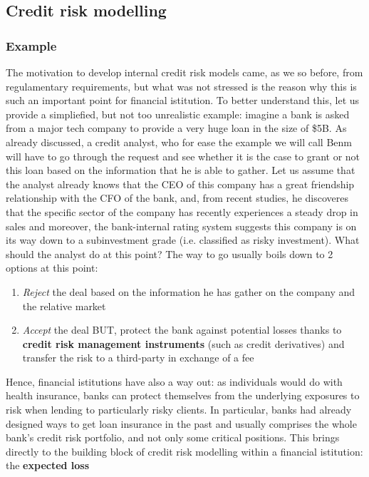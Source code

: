 \documentclass[a4paper,12pt]{article}
\begin{document}
    \subsection[]{Credit risk modelling}

    \subsubsection{Example}
    The motivation to develop internal credit risk models came, as we so before, from regulamentary requirements, but what was not stressed is the reason why this is such an important point
    for financial istitution. To better understand this, let us provide a simpliefied, but not too unrealistic example: imagine a bank is asked from a major tech company to provide a very huge
    loan in the size of \$5B. As already discussed, a credit analyst, who for ease the example we will call Benm will have to go through the request and see whether it is the case to grant or not this loan 
    based on the information that he is able to gather. 
    Let us assume that the analyst already knows that the CEO of this company has a great friendship relationship with the CFO of the bank, and, from recent studies, he discoveres that the specific sector 
    of the company has recently experiences a steady drop in sales and moreover, the bank-internal rating system suggests this company is on its way down to a subinvestment grade (i.e. classified as risky investment). 
    What should the analyst do at this point? The way to go usually boils down to 2 options at this point:

        \begin{enumerate}
            \item \textit{Reject} the deal based on the information he has gather on the company and the relative market
            \item \textit{Accept} the deal BUT, protect the bank against potential losses thanks to \textbf{credit risk management instruments} (such as credit derivatives) and transfer the risk to a third-party in exchange of a fee
        \end{enumerate}

    Hence, financial istitutions have also a way out: as individuals would do with health insurance, banks can protect themselves from the underlying exposures to risk when lending to particularly risky clients. 
    In particular, banks had already designed ways to get loan insurance in the past and usually comprises the whole bank's credit risk portfolio, and not only some critical positions. This brings directly to
    the building block of credit risk modelling within a financial istitution: the \textbf{expected loss}
\end{document}
